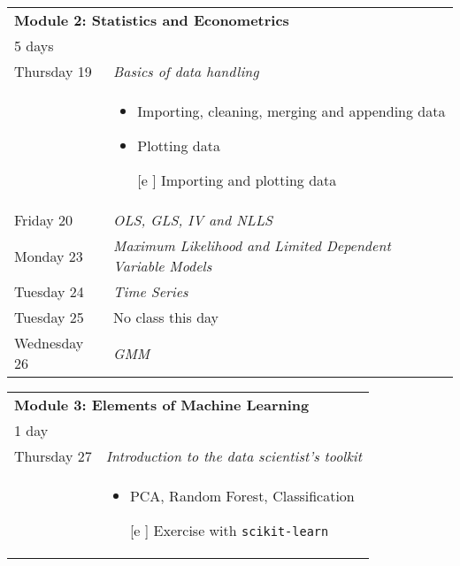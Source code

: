 \documentclass{amsart}
\theoremstyle{definition}
\theoremstyle{remark}
\numberwithin{equation}{section}
\begin{document}
\begin{center}
        \begin{tabular}{| p{2.5cm} | p{12.5cm} |}
    \hline
    \multicolumn{2}{|l|}{\textbf{Module 2: Statistics and Econometrics}} \\
    \multicolumn{2}{|l|}{5 days} \\
    \hline
    Thursday 19 & \textit{Basics of data handling} \\
        & \begin{itemize}
                \item Importing, cleaning, merging and appending data
                \item Plotting data
                \item [[e]] Importing and plotting data
            \end{itemize}
            \\
    Friday 20 & \textit{OLS, GLS, IV and NLLS}\\
    Monday 23 & \textit{Maximum Likelihood and Limited Dependent Variable Models}\\
    Tuesday 24 & \textit{Time Series}\\
    Tuesday 25 & No class this day\\
    Wednesday 26 & \textit{GMM} \\
\hline
    \end{tabular}
\end{center}

\begin{center}
    \begin{tabular}{| p{2.5cm} | p{12.5cm} |}
    \hline
    \multicolumn{2}{|l|}{\textbf{Module 3: Elements of Machine Learning}} \\
    \multicolumn{2}{|l|}{1 day} \\
    \hline
    Thursday 27 & \textit{Introduction to the data scientist's toolkit} \\
        & \begin{itemize}
                \item PCA, Random Forest, Classification
                \item [[e]] Exercise with \texttt{scikit-learn}
            \end{itemize} \\
    \hline
    \end{tabular}

\end{center}

\begin{center}
    
\end{center}
\end{document}
